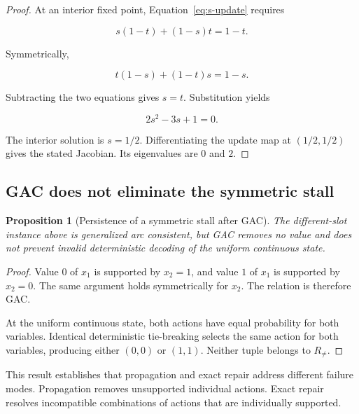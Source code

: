 \documentclass[pdflatex,sn-mathphys-num,iicol,oneside]{sn-jnl}
\newtheorem{proposition}{Proposition}
\begin{document}
\begin{proof}
At an interior fixed point,
Equation~\eqref{eq:s-update} requires

\begin{equation}
s(1-t)+(1-s)t=1-t.
\end{equation}

Symmetrically,

\begin{equation}
t(1-s)+(1-t)s=1-s.
\end{equation}

Subtracting the two equations gives $s=t$. Substitution yields

\begin{equation}
2s^2-3s+1=0.
\end{equation}

The interior solution is $s=1/2$. Differentiating the update map at
$(1/2,1/2)$ gives the stated Jacobian. Its eigenvalues are $0$ and
$2$.
\end{proof}

\subsection{GAC does not eliminate the symmetric stall}

\begin{proposition}[Persistence of a symmetric stall after GAC]
The different-slot instance above is generalized arc consistent, but
GAC removes no value and does not prevent invalid deterministic
decoding of the uniform continuous state.
\end{proposition}

\begin{proof}
Value $0$ of $x_1$ is supported by $x_2=1$, and value $1$ of $x_1$ is
supported by $x_2=0$. The same argument holds symmetrically for $x_2$.
The relation is therefore GAC.

At the uniform continuous state, both actions have equal probability
for both variables. Identical deterministic tie-breaking selects the
same action for both variables, producing either $(0,0)$ or $(1,1)$.
Neither tuple belongs to $R_{\neq}$.
\end{proof}

This result establishes that propagation and exact repair address
different failure modes. Propagation removes unsupported individual
actions. Exact repair resolves incompatible combinations of actions
that are individually supported.
\end{document}
